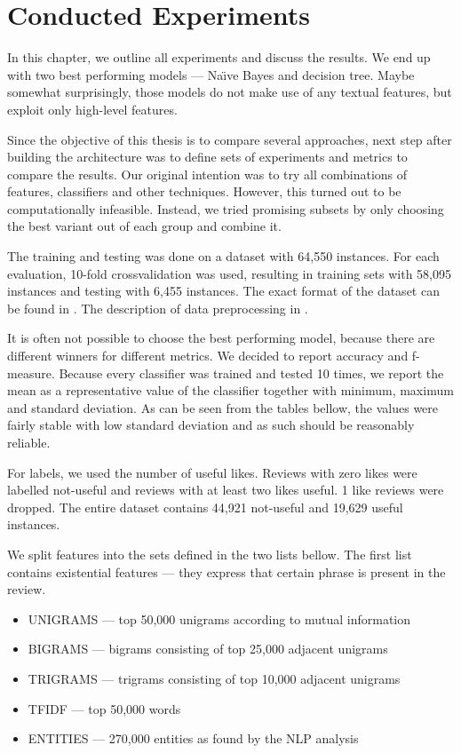 \chapter{Conducted Experiments}\label{chap:exp}

In this chapter, we outline all experiments and discuss the results.
We end up with two best performing models --- Na\"{\i}ve Bayes and decision tree.
Maybe somewhat surprisingly, those models do not make use of any textual features,
but exploit only high-level features.

Since the objective of this thesis is to compare several approaches,
next step after building the architecture was to define sets of experiments and metrics to compare the results.
Our original intention was to try all combinations of features, classifiers and other techniques.
However, this turned out to be computationally infeasible.
Instead, we tried promising subsets by only choosing the best variant out of each group and combine it.

The training and testing was done on a dataset with 64,550 instances.
For each evaluation, 10-fold crossvalidation was used, resulting in
training sets with 58,095 instances and testing with 6,455 instances.
The exact format of the dataset can be found in .
The description of data preprocessing in .

It is often not possible to choose the best performing model,
because there are different winners for different metrics.
We decided to report accuracy and f-measure.
Because every classifier was trained and tested 10 times,
we report the mean as a representative value of the classifier
together with minimum, maximum and standard deviation.
As can be seen from the tables bellow, 
the values were fairly stable with low standard deviation and
as such should be reasonably reliable.

For labels, we used the number of useful likes.
Reviews with zero likes were labelled not-useful and
reviews with at least two likes useful.
1 like reviews were dropped.
The entire dataset contains 44,921 not-useful and
19,629 useful instances.

We split features into the sets defined in the two lists bellow.
The first list contains existential features --- they express that certain phrase is present in the review.

\begin{itemize}
	\item UNIGRAMS --- top 50,000 unigrams according to mutual information
	\item BIGRAMS --- bigrams consisting of top 25,000 adjacent unigrams
	\item TRIGRAMS  --- trigrams consisting of top 10,000 adjacent unigrams
	\item TFIDF  --- top 50,000 words
	\item ENTITIES --- 270,000 entities as found by the NLP analysis
\end{itemize}

